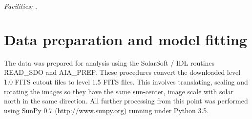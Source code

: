 \documentclass[onecolumn]{emulateapj}
\begin{document}


{\it Facilities:} .



\appendix\section{Data preparation and model
  fitting}\label{sec:app:data}

The data was prepared for analysis using the SolarSoft / IDL routines
READ\_SDO and AIA\_PREP.  These procedures convert the downloaded
level 1.0 FITS cutout files to level 1.5 FITS files.  This involves
translating, scaling and rotating the images so they have the same
sun-center, image scale with solar north in the same direction.  All
further processing from this point was performed using SunPy 0.7
(http://www.sunpy.org) running under Python 3.5.  
\end{document}
